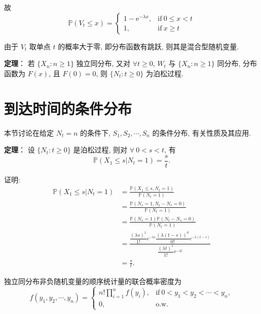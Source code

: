 \documentclass[openany]{ctexbook}
\theoremstyle{kaiti}
\theoremstyle{normal}
\begin{document}
  故
\begin{equation}
    \mathbb{P}(V_t\leqslant x)=
    \begin{cases}
      1-\mathrm{e}^{-\lambda x}, &\text{if}~ 0 \leqslant x < t\\
      1, & \text{if}~x\geqslant t
    \end{cases}
\end{equation}
  
  由于 $V_t$ 取单点 $t$ 的概率大于零, 即分布函数有跳跃, 则其是混合型随机变量.
  
\textbf{定理}：  
  若 $\{X_n:n\geqslant1\}$ 独立同分布, 又对 $\forall t\geqslant0$, $W_t$ 与 $\{X_n:n\geqslant1\}$ 同分布, 分布函数为 $F(x)$, 且 $F(0)=0$, 则 $\{N_t:t\geqslant0\}$ 为泊松过程.
  
\section{到达时间的条件分布}
  
  本节讨论在给定 $N_t=n$ 的条件下, $S_1,S_2,\cdots,S_n$ 的条件分布, 有关性质及其应用.
  
\textbf{定理}：  
  设 $\{N_t:t\geqslant0\}$ 是泊松过程, 则对 $\forall~0 < s < t$, 有
\begin{equation}
    \mathbb{P}(X_1\leqslant s|N_t=1)=\frac{s}{t}.
\end{equation}
  
  证明: 
\begin{equation}
    \begin{aligned}
      \mathbb{P}(X_1\leqslant s|N_t=1)
      &=\frac{\mathbb{P}(X_1\leqslant s,N_t=1)}{\mathbb{P}(N_t=1)}\\
      &=\frac{\mathbb{P}(N_s=1,N_t-N_s=0)}{\mathbb{P}(N_t=1)}\\
      &=\frac{\mathbb{P}(N_s=1)\mathbb{P}(N_t-N_s=0)}{\mathbb{P}(N_t=1)}\\
      &=\frac{\dfrac{(\lambda s)^1}{1!}\mathrm{e}^{-\lambda s}\dfrac{(\lambda (t-s))^0}{0!}\mathrm{e}^{-\lambda (t-s)}}{\dfrac{(\lambda t)^1}{1!}\mathrm{e}^{-\lambda t}}\\
      &=\frac{s}{t}.
    \end{aligned}
\end{equation}
  
  独立同分布非负随机变量的顺序统计量的联合概率密度为
\begin{equation}
    f(y_1,y_2,\cdots,y_n)=
    \begin{cases}
      \displaystyle n!\prod_{i=1}^n f(y_i), &\text{if}~0 < y_1 < y_2 < \cdots < y_n,\\
      0, &\text{o.w.}
    \end{cases}
\end{equation}
  
\end{document}
